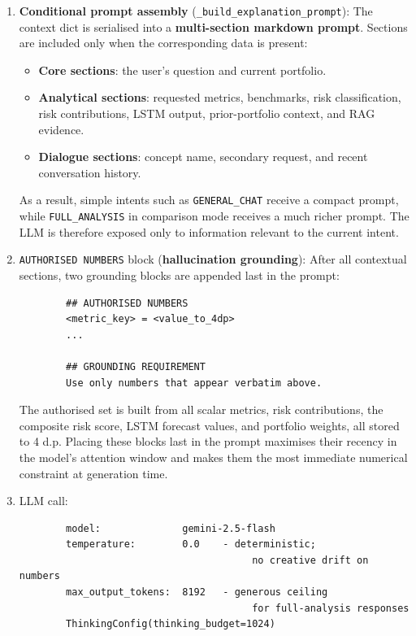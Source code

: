 \begin{enumerate}
    \item \textbf{Conditional prompt assembly} (\texttt{\_build\_explanation\_prompt}):
    The context dict is serialised into a \textbf{multi-section markdown prompt}. Sections are included only when the corresponding data is present:
    \begin{itemize}
        \item \textbf{Core sections}: the user's question and current portfolio.
        \item \textbf{Analytical sections}: requested metrics, benchmarks, risk classification, risk contributions, LSTM output, prior-portfolio context, and RAG evidence.
        \item \textbf{Dialogue sections}: concept name, secondary request, and recent conversation history.
    \end{itemize}

    As a result, simple intents such as \texttt{GENERAL\_CHAT} receive a compact prompt, while \texttt{FULL\_ANALYSIS} in comparison mode receives a much richer prompt. The LLM is therefore exposed only to information relevant to the current intent.

    \item \texttt{AUTHORISED NUMBERS} block (\textbf{hallucination grounding}):
    After all contextual sections, two grounding blocks are appended last in the prompt:

    \begin{lstlisting}
        ## AUTHORISED NUMBERS
        <metric_key> = <value_to_4dp>
        ...

        ## GROUNDING REQUIREMENT
        Use only numbers that appear verbatim above.
    \end{lstlisting}

    The authorised set is built from all scalar metrics, risk contributions, the composite risk score, LSTM forecast values, and portfolio weights, all stored to 4 d.p. Placing these blocks last in the prompt maximises their recency in the model's attention window and makes them the most immediate numerical constraint at generation time.

    \item LLM call:
    \begin{lstlisting}
        model:              gemini-2.5-flash
        temperature:        0.0    - deterministic; 
                                        no creative drift on numbers
        max_output_tokens:  8192   - generous ceiling 
                                        for full-analysis responses
        ThinkingConfig(thinking_budget=1024)
    \end{lstlisting}


\end{enumerate}
